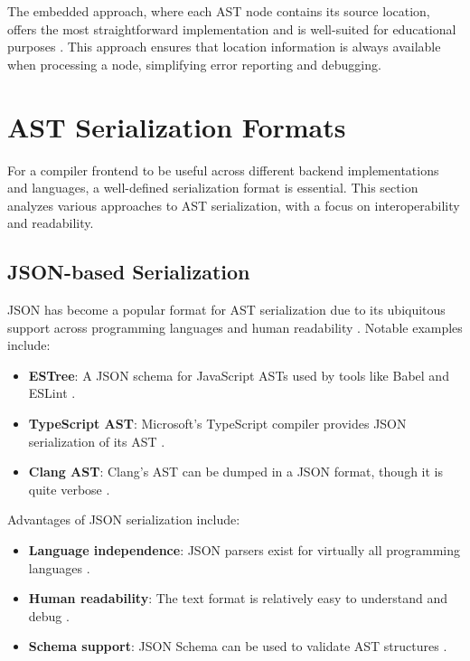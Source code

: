 The embedded approach, where each AST node contains its source location, offers the most straightforward implementation and is well-suited for educational purposes \cite{appel2004modern}. This approach ensures that location information is always available when processing a node, simplifying error reporting and debugging.

\section{AST Serialization Formats}

For a compiler frontend to be useful across different backend implementations and languages, a well-defined serialization format is essential. This section analyzes various approaches to AST serialization, with a focus on interoperability and readability.

\subsection{JSON-based Serialization}

JSON has become a popular format for AST serialization due to its ubiquitous support across programming languages and human readability \cite{crockford2006json}. Notable examples include:

\begin{itemize}
    \item \textbf{ESTree}: A JSON schema for JavaScript ASTs used by tools like Babel and ESLint \cite{babel2015estree}.
    \item \textbf{TypeScript AST}: Microsoft's TypeScript compiler provides JSON serialization of its AST \cite{microsoft2018typescript}.
    \item \textbf{Clang AST}: Clang's AST can be dumped in a JSON format, though it is quite verbose \cite{lattner2008llvm}.
\end{itemize}

Advantages of JSON serialization include:
\begin{itemize}
    \item \textbf{Language independence}: JSON parsers exist for virtually all programming languages \cite{crockford2006json}.
    \item \textbf{Human readability}: The text format is relatively easy to understand and debug \cite{crockford2006json}.
    \item \textbf{Schema support}: JSON Schema can be used to validate AST structures \cite{jsonschema2019}.
\end{itemize}

